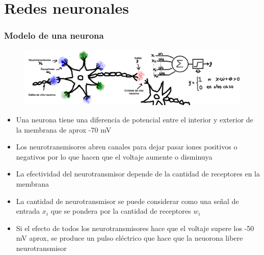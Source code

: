\section{Redes neuronales}

\begin{frame}\frametitle{Modelo de una neurona}
  \begin{figure}
    \centering
    \includegraphics[height=0.4\textheight]{Figures/NN_Neurona.png}
  \end{figure}
  \begin{itemize}
  \item Una neurona tiene una diferencia de potencial entre el interior y exterior de la membrana de aprox -70 mV
  \item Los neurotransmisores abren canales para dejar pasar iones positivos o negativos por lo que hacen que el voltaje aumente o disminuya
  \item La efectividad del neurotransmisor depende de la cantidad de receptores en la membrana
  \item La cantidad de neurotransmisor se puede considerar como una señal de entrada $x_i$ que se pondera por la cantidad de receptores $w_i$
  \item Si el efecto de todos los neurotransmisores hace que el voltaje supere los -50 mV aprox, se produce un pulso eléctrico que hace que la neuorona libere neurotransmisor 
  \end{itemize}
  \begin{columns}
    \begin{column}{0.6\textwidth}
    \end{column}
    \begin{column}{0.4\textwidth}
    \end{column}
  \end{columns}
\end{frame}

